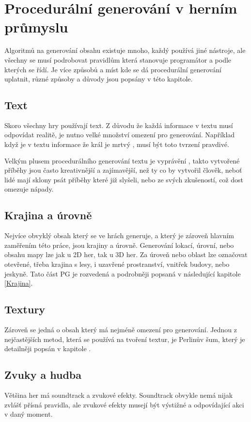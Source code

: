 
\section{Procedurální generování v herním průmyslu}
\label{proceduralInGames}
Algoritmů na generování obsahu existuje mnoho, každý používá jiné nástroje, ale všechny se musí podrobovat pravidlům která stanovuje programátor a podle kterých se řídí. Je více způsobů a míst kde se dá procedurální generování uplatnit, různé způsoby a důvody jsou popsány v této kapitole.

\subsection{Text}
Skoro všechny hry používají text. Z důvodu že každá informace v textu musí odpovídat realitě, je nutno velké množství omezení pro generování. Například když je v textu informace že král je mrtvý \cite{liuDeep}, musí být toto tvrzení pravdivé.

Velkým plusem procedurálního generování textu je vyprávění \cite{madoc59000}, takto vytvořené příběhy jsou často kreativnější a zajímavější, než ty co by vytvořil člověk, neboť lidé mají sklony psát příběhy které již slyšeli, nebo ze svých zkušeností, což dost omezuje nápady.

\subsection{Krajina a úrovně}
Nejvíce obvyklý obsah který se ve hrách generuje, a který je zároveň hlavním zaměřením této práce, jsou krajiny a úrovně. Generování lokací, úrovní, nebo obsahu mapy lze jak u 2D her, tak u 3D her. Za úroveň nebo oblast lze označovat otevřené, třeba krajina s lesy, i uzavřené prostranství, vnitřek budovy, nebo jeskyně. Tato část PG je rozvedená a podrobněji popsaná v následující kapitole \ref{Krajina}.

\subsection{Textury}
Zároveň se jedná o obsah který má nejméně omezení pro generování. Jednou z nejčastějších metod, která se používá na tvoření textur, je  Perlinův šum, který je detailněji popsán v kapitole .

\subsection{Zvuky a hudba}
Většina her má soundtrack a zvukové efekty. Soundtrack obvykle nemá nijak zvlášť přísná pravidla, ale zvukové efekty musejí být výstižné a odpovídající akci v daný moment. 

